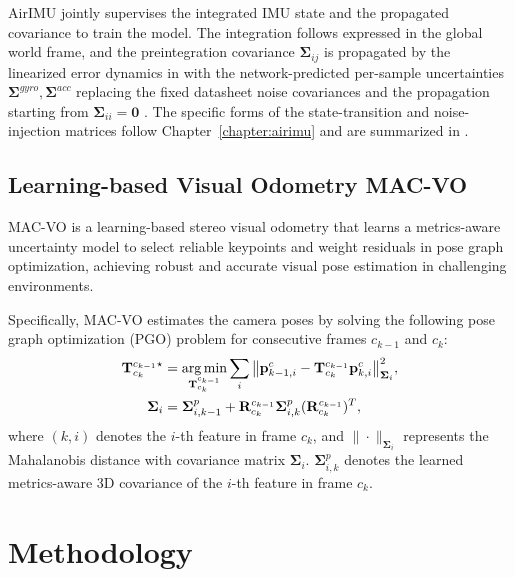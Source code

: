 AirIMU jointly supervises the integrated IMU state and the propagated covariance to train the model.
The integration follows  expressed in the global world frame, and the preintegration covariance $\bm{\Sigma}_{ij}$ is propagated by the linearized error dynamics in  with the network-predicted per-sample uncertainties $\bm{\Sigma}^{gyro},\bm{\Sigma}^{acc}$ replacing the fixed datasheet noise covariances and the propagation starting from $\bm{\Sigma}_{ii}=\mathbf{0}$ \cite{forster2015imu}.
The specific forms of the state-transition and noise-injection matrices follow Chapter~\ref{chapter:airimu} and are summarized in .

\subsection{Learning-based Visual Odometry MAC-VO}
MAC-VO \cite{qiu2025mac} is a learning-based stereo visual odometry that learns a metrics-aware uncertainty model to select reliable keypoints and weight residuals in pose graph optimization, achieving robust and accurate visual pose estimation in challenging environments.

Specifically, MAC-VO estimates the camera poses by solving the following pose graph optimization (PGO) problem for consecutive frames $c_{k-1}$ and $c_k$:
\begin{equation}
\begin{aligned}
    \mathbf{T}^{c_{k-1}}_{c_k}{}^\star &= \operatorname*{arg\,min}_{\mathbf{T}^{c_{k-1}}_{c_k}}{\sum_{i}{\left\| \mathbf{p}_{k-1, i}^{c} - \mathbf{T}^{c_{k-1}}_{c_k} \mathbf{p}^{c}_{k, i} \right\|^2_{\bm{\Sigma}_i}}}, \\
    \bm{\Sigma}_i &= \bm{\Sigma}^p_{i,k-1} + \mathbf{R}^{c_{k-1}}_{c_k} \bm{\Sigma}^p_{i,k} (\mathbf{R}^{c_{k-1}}_{c_k})^T,
\end{aligned}
\label{eq:maci2:macvo}
\end{equation}
where $(k, i)$ denotes the $i$-th feature in frame $c_k$, and $\|\cdot\|_{\bm{\Sigma}_i}$ represents the Mahalanobis distance with covariance matrix $\bm{\Sigma}_i$. $\bm{\Sigma}^p_{i,k}$ denotes the learned metrics-aware 3D covariance of the $i$-th feature in frame $c_k$.


\section{Methodology}
\label{sec:maci2:method}

